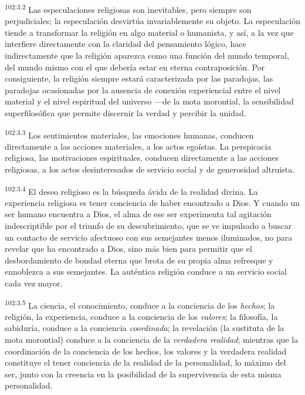 \par
\textsuperscript{102:3.2} Las especulaciones religiosas son inevitables, pero siempre son perjudiciales; la especulación desvirtúa invariablemente su objeto. La especulación tiende a transformar la religión en algo material o humanista, y así, a la vez que interfiere directamente con la claridad del pensamiento lógico, hace indirectamente que la religión aparezca como una función del mundo temporal, del mundo mismo con el que debería estar en eterna contraposición. Por consiguiente, la religión siempre estará caracterizada por las paradojas, las paradojas ocasionadas por la ausencia de conexión experiencial entre el nivel material y el nivel espiritual del universo ---de la mota morontial, la sensibilidad superfilosófica que permite discernir la verdad y percibir la unidad.

\par
\textsuperscript{102:3.3} Los sentimientos materiales, las emociones humanas, conducen directamente a las acciones materiales, a los actos egoístas. La perspicacia religiosa, las motivaciones espirituales, conducen directamente a las acciones religiosas, a los actos desinteresados de servicio social y de generosidad altruista.

\par
\textsuperscript{102:3.4} El deseo religioso es la búsqueda ávida de la realidad divina. La experiencia religiosa es tener conciencia de haber encontrado a Dios. Y cuando un ser humano encuentra a Dios, el alma de ese ser experimenta tal agitación indescriptible por el triunfo de su descubrimiento, que se ve impulsado a buscar un contacto de servicio afectuoso con sus semejantes menos iluminados, no para revelar que ha encontrado a Dios, sino más bien para permitir que el desbordamiento de bondad eterna que brota de su propia alma refresque y ennoblezca a sus semejantes. La auténtica religión conduce a un servicio social cada vez mayor.

\par
\textsuperscript{102:3.5} La ciencia, el conocimiento, conduce a la conciencia de los \textit{hechos}; la religión, la experiencia, conduce a la conciencia de los \textit{valores}; la filosofía, la sabiduría, conduce a la conciencia \textit{coordinada}; la revelación (la sustituta de la mota morontial) conduce a la conciencia de la \textit{verdadera realidad}; mientras que la coordinación de la conciencia de los hechos, los valores y la verdadera realidad constituye el tener conciencia de la realidad de la personalidad, lo máximo del ser, junto con la creencia en la posibilidad de la supervivencia de esta misma personalidad.

